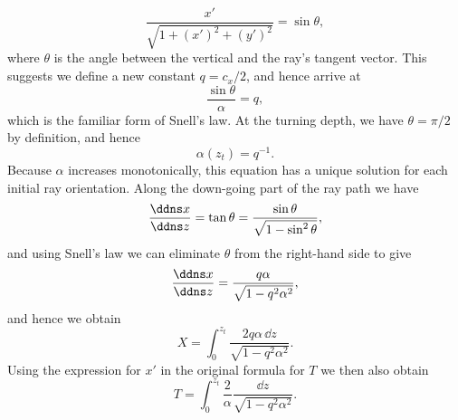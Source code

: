 \begin{enumerate}
\begin{equation*}
    \frac{x'}{\sqrt{1+(x')^{2}+(y')^{2}}}=\sin\theta,
\end{equation*}
where $\theta$ is the angle between the vertical and the ray's tangent vector. This suggests we define a new constant $q=c_{x}/2$, and hence arrive at
\begin{equation*}
    \frac{\sin\theta}{\alpha}=q,
\end{equation*}
which is the familiar form of Snell's law. At the turning depth, we have $\theta=\pi/2$ by definition, and hence
\begin{equation*}
    \alpha(z_{t})=q^{-1}.
\end{equation*}
Because $\alpha$ increases monotonically, this equation has a unique solution for each initial ray orientation. Along the down-going part of the ray path we have
\begin{equation*}
    \frac{\ddns x}{\ddns z}=\tan\theta=\frac{\sin\theta}{\sqrt{1-\sin^{2}\theta}},
\end{equation*}
and using Snell's law we can eliminate $\theta$ from the right-hand side to give
\begin{equation*}
    \frac{\ddns x}{\ddns z}=\frac{q\alpha}{\sqrt{1-q^{2}\alpha^{2}}},
\end{equation*}
and hence we obtain
\begin{equation*}
    X=\int_{0}^{z_{t}}\frac{2q\alpha\,\dd z}{\sqrt{1-q^{2}\alpha^{2}}}.
\end{equation*}
Using the expression for $x'$ in the original formula for $T$ we then also obtain
\begin{equation*}
    T=\int_{0}^{z_{t}}\frac{2}{\alpha}\frac{\dd z}{\sqrt{1-q^{2}\alpha^{2}}}.
\end{equation*}


\end{enumerate}
